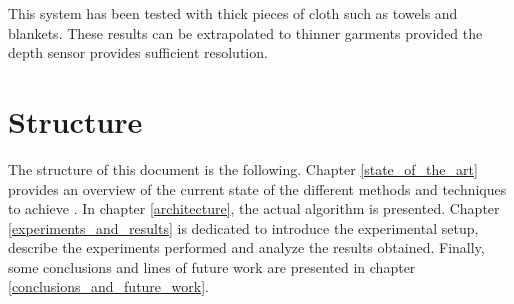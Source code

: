 This system has been tested with thick pieces of cloth such as towels and blankets. These results can be extrapolated to thinner garments provided the depth sensor provides sufficient resolution.

\section{Structure}
\label{intro_structure}

The structure of this document is the following. Chapter \ref{state_of_the_art} provides an overview of the current state of the different methods and techniques to achieve . In chapter \ref{architecture}, the actual algorithm is presented. Chapter \ref{experiments_and_results} is dedicated to introduce the experimental setup, describe the experiments performed and analyze the results obtained. Finally, some conclusions and lines of future work are presented in chapter \ref{conclusions_and_future_work}.
